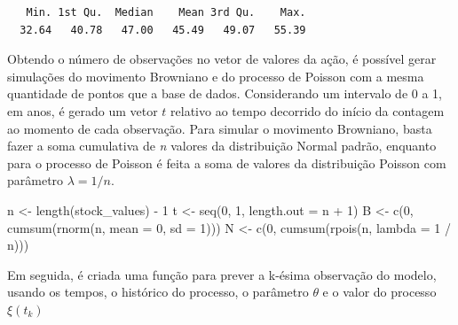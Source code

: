 \documentclass[
  letterpaper,
  DIV=11,
  numbers=noendperiod]{scrreprt}
\newenvironment{Shaded}{\begin{snugshade}}{\end{snugshade}}
\newcommand{\AttributeTok}[1]{\textcolor[rgb]{0.40,0.45,0.13}{#1}}
\newcommand{\DecValTok}[1]{\textcolor[rgb]{0.68,0.00,0.00}{#1}}
\newcommand{\FunctionTok}[1]{\textcolor[rgb]{0.28,0.35,0.67}{#1}}
\newcommand{\NormalTok}[1]{\textcolor[rgb]{0.00,0.23,0.31}{#1}}
\newcommand{\OtherTok}[1]{\textcolor[rgb]{0.00,0.23,0.31}{#1}}
\newcommand{\SpecialCharTok}[1]{\textcolor[rgb]{0.37,0.37,0.37}{#1}}
\begin{document}
\begin{verbatim}
   Min. 1st Qu.  Median    Mean 3rd Qu.    Max. 
  32.64   40.78   47.00   45.49   49.07   55.39 
\end{verbatim}

Obtendo o número de observações no vetor de valores da ação, é possível
gerar simulações do movimento Browniano e do processo de Poisson com a
mesma quantidade de pontos que a base de dados. Considerando um
intervalo de 0 a 1, em anos, é gerado um vetor \(t\) relativo ao tempo
decorrido do início da contagem ao momento de cada observação. Para
simular o movimento Browniano, basta fazer a soma cumulativa de \emph{n}
valores da distribuição Normal padrão, enquanto para o processo de
Poisson é feita a soma de valores da distribuição Poisson com parâmetro
\(\lambda=1/n\).

\begin{Shaded}
\begin{Highlighting}[]
\NormalTok{n }\OtherTok{\textless{}{-}} \FunctionTok{length}\NormalTok{(stock\_values) }\SpecialCharTok{{-}} \DecValTok{1}
\NormalTok{t }\OtherTok{\textless{}{-}} \FunctionTok{seq}\NormalTok{(}\DecValTok{0}\NormalTok{, }\DecValTok{1}\NormalTok{, }\AttributeTok{length.out =}\NormalTok{ n }\SpecialCharTok{+} \DecValTok{1}\NormalTok{)}
\NormalTok{B }\OtherTok{\textless{}{-}} \FunctionTok{c}\NormalTok{(}\DecValTok{0}\NormalTok{, }\FunctionTok{cumsum}\NormalTok{(}\FunctionTok{rnorm}\NormalTok{(n, }\AttributeTok{mean =} \DecValTok{0}\NormalTok{, }\AttributeTok{sd =} \DecValTok{1}\NormalTok{)))}
\NormalTok{N }\OtherTok{\textless{}{-}} \FunctionTok{c}\NormalTok{(}\DecValTok{0}\NormalTok{, }\FunctionTok{cumsum}\NormalTok{(}\FunctionTok{rpois}\NormalTok{(n, }\AttributeTok{lambda =} \DecValTok{1} \SpecialCharTok{/}\NormalTok{ n)))}
\end{Highlighting}
\end{Shaded}

Em seguida, é criada uma função para prever a k-ésima observação do
modelo, usando os tempos, o histórico do processo, o parâmetro
\(\theta\) e o valor do processo \(\xi(t_{k})\)
\end{document}
